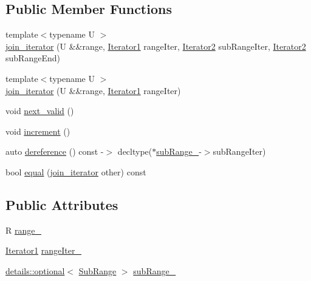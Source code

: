 \subsection*{Public Member Functions}
\begin{DoxyCompactItemize}
\item 
{\footnotesize template$<$typename U $>$ }\\\mbox{\hyperlink{structrah_1_1view_1_1join__iterator_a5a30ddd6e3809e32be7d6dc723c4afe5}{join\+\_\+iterator}} (U \&\&range, \mbox{\hyperlink{structrah_1_1view_1_1join__iterator_a8b71c6f25eee2915e2a8afc6e024196d}{Iterator1}} range\+Iter, \mbox{\hyperlink{structrah_1_1view_1_1join__iterator_ae03a066174f3422c70d0e3c22e68d9f7}{Iterator2}} sub\+Range\+Iter, \mbox{\hyperlink{structrah_1_1view_1_1join__iterator_ae03a066174f3422c70d0e3c22e68d9f7}{Iterator2}} sub\+Range\+End)
\item 
{\footnotesize template$<$typename U $>$ }\\\mbox{\hyperlink{structrah_1_1view_1_1join__iterator_a2ba7e5d1fd1ea1e786ca894fe96ffeb4}{join\+\_\+iterator}} (U \&\&range, \mbox{\hyperlink{structrah_1_1view_1_1join__iterator_a8b71c6f25eee2915e2a8afc6e024196d}{Iterator1}} range\+Iter)
\item 
void \mbox{\hyperlink{structrah_1_1view_1_1join__iterator_a6b3ef13305f87d011e2fecdb28b5dec6}{next\+\_\+valid}} ()
\item 
void \mbox{\hyperlink{structrah_1_1view_1_1join__iterator_a4f81464b6ff2707bb21d2bbd409c4f4d}{increment}} ()
\item 
auto \mbox{\hyperlink{structrah_1_1view_1_1join__iterator_ac7bc0fcd91d164f86d5813421a08d38a}{dereference}} () const -\/$>$ decltype($\ast$\mbox{\hyperlink{structrah_1_1view_1_1join__iterator_ae9351284af0f64c368606315da0b56a5}{sub\+Range\+\_\+}}-\/$>$sub\+Range\+Iter)
\item 
bool \mbox{\hyperlink{structrah_1_1view_1_1join__iterator_a76c4e51e7c191e189e01d15eff2b7055}{equal}} (\mbox{\hyperlink{structrah_1_1view_1_1join__iterator}{join\+\_\+iterator}} other) const
\end{DoxyCompactItemize}
\subsection*{Public Attributes}
\begin{DoxyCompactItemize}
\item 
R \mbox{\hyperlink{structrah_1_1view_1_1join__iterator_ad167fb9c44c21ad59d5acfa9031e9153}{range\+\_\+}}
\item 
\mbox{\hyperlink{structrah_1_1view_1_1join__iterator_a8b71c6f25eee2915e2a8afc6e024196d}{Iterator1}} \mbox{\hyperlink{structrah_1_1view_1_1join__iterator_a754b7bdee5ca2b23868a402c2c3cfcc2}{range\+Iter\+\_\+}}
\item 
\mbox{\hyperlink{structrah_1_1view_1_1details_1_1optional}{details\+::optional}}$<$ \mbox{\hyperlink{structrah_1_1view_1_1join__iterator_1_1_sub_range}{Sub\+Range}} $>$ \mbox{\hyperlink{structrah_1_1view_1_1join__iterator_ae9351284af0f64c368606315da0b56a5}{sub\+Range\+\_\+}}
\end{DoxyCompactItemize}


